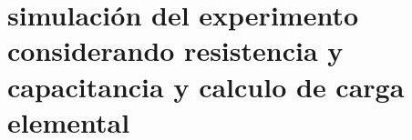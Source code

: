 \documentclass[
 reprint,
 amsmath,amssymb,
 aps,
]{revtex4-2}
\begin{document}
\section{ simulación del experimento considerando resistencia y capacitancia y calculo de carga elemental
}

\nocite{*}

\end{document}
